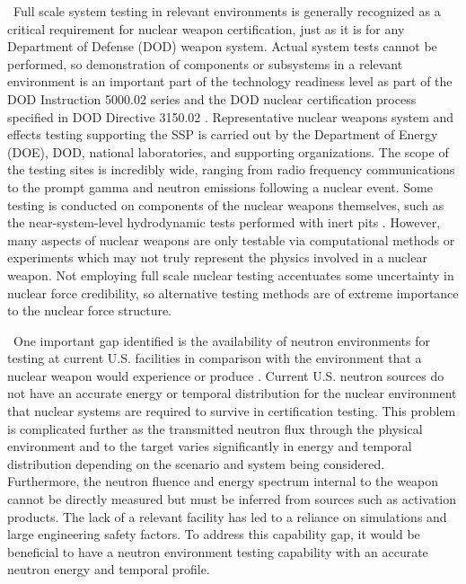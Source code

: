 \ Full scale system testing in relevant environments is generally recognized as a critical requirement for nuclear weapon certification, just as it is for any Department of Defense (DOD) weapon system. Actual system tests cannot be performed, so demonstration of components or subsystems in a relevant environment is an important part of the technology readiness level as part of the DOD Instruction 5000.02 series \cite{DODI50002} and the DOD nuclear certification process specified in DOD Directive 3150.02 \cite{DODD315002}. 
Representative nuclear weapons system and effects testing supporting the SSP is carried out by the Department of Energy (DOE), DOD, national laboratories, and supporting organizations. The scope of the testing sites is incredibly wide, ranging from radio frequency communications to the prompt gamma and neutron emissions following a nuclear event. %
Some testing is conducted on components of the nuclear weapons themselves, such as the near-system-level hydrodynamic tests performed with inert pits \cite{martz2014without}. However, many aspects of nuclear weapons are only testable via computational methods or experiments which may not truly represent the physics involved in a nuclear weapon. 
Not employing full scale nuclear testing accentuates some uncertainty in nuclear force credibility, so  alternative testing methods are of extreme importance to the nuclear force structure. 

\ One important gap identified is the availability of neutron environments for testing at current U.S. facilities in comparison with the environment that a nuclear weapon would experience or produce \cite{JointDefenseScienceBoard/ThreatReductionAdvisoryComitteeTaskForce2010}. 
Current U.S. neutron sources do not have an accurate energy or temporal distribution for the nuclear environment that nuclear systems are required to survive in certification testing. 
This problem is complicated further as the transmitted neutron flux through the physical environment and to the target varies significantly in energy and temporal distribution depending on the scenario and system being considered.  
Furthermore, the neutron fluence and energy spectrum internal to the weapon cannot be directly measured but must be inferred from sources such as activation products. 
The lack of a relevant facility has led to a reliance on simulations and large engineering safety factors\cite{JointDefenseScienceBoard/ThreatReductionAdvisoryComitteeTaskForce2005}.  To address this capability gap, it would be beneficial to have a neutron environment testing capability with an accurate neutron energy and temporal profile.


